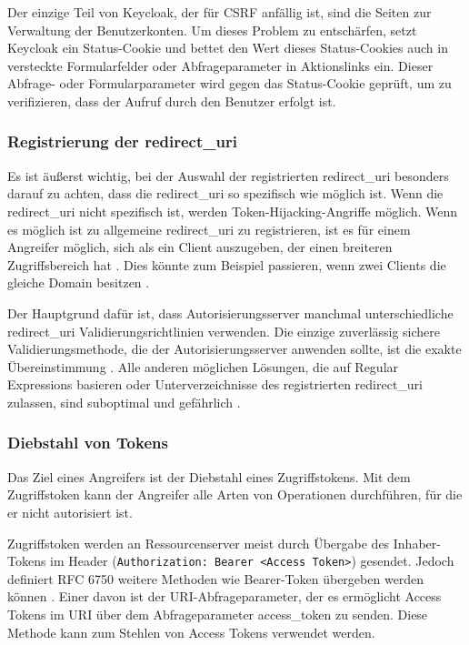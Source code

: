 Der einzige Teil von Keycloak, der für CSRF anfällig ist, sind die Seiten zur Verwaltung der Benutzerkonten. Um dieses Problem zu entschärfen, setzt Keycloak ein Status-Cookie und bettet den Wert dieses Status-Cookies auch in versteckte Formularfelder oder Abfrageparameter in Aktionslinks ein. Dieser Abfrage- oder Formularparameter wird gegen das Status-Cookie geprüft, um zu verifizieren, dass der Aufruf durch den Benutzer erfolgt ist. \cite{keycloakDocs}

\subsubsection{Registrierung der redirect\_uri}

Es ist äußerst wichtig, bei der Auswahl der registrierten redirect\_uri besonders darauf zu achten, dass die redirect\_uri so spezifisch wie möglich ist. Wenn die redirect\_uri nicht spezifisch ist, werden Token-Hijacking-Angriffe möglich. Wenn es möglich ist zu allgemeine redirect\_uri zu registrieren, ist es für einem Angreifer möglich, sich als ein Client auszugeben, der einen breiteren Zugriffsbereich hat \cite{keycloakDocs}. Dies könnte zum Beispiel passieren, wenn zwei Clients die gleiche Domain besitzen \cite{keycloakDocs}.

Der Hauptgrund dafür ist, dass Autorisierungsserver manchmal unterschiedliche redirect\_uri Validierungsrichtlinien verwenden. Die einzige zuverlässig sichere Validierungsmethode, die der Autorisierungsserver anwenden sollte, ist die exakte Übereinstimmung \cite{OAuth2inAction}. Alle anderen möglichen Lösungen, die auf Regular Expressions basieren oder Unterverzeichnisse des registrierten redirect\_uri zulassen, sind suboptimal und gefährlich \cite{OAuth2inAction}.



\subsubsection{Diebstahl von Tokens}

Das Ziel eines Angreifers ist der Diebstahl eines Zugriffstokens. Mit dem Zugriffstoken kann der Angreifer alle Arten von Operationen durchführen, für die er nicht autorisiert ist. 

Zugriffstoken werden an Ressourcenserver meist durch Übergabe des Inhaber-Tokens im Header (\texttt{Authorization: Bearer <Access Token>}) gesendet. Jedoch definiert RFC 6750 weitere Methoden wie Bearer-Token übergeben werden können \cite{RFC6750}. Einer davon ist der URI-Abfrageparameter, der es ermöglicht Access Tokens im URI über dem Abfrageparameter access\_token zu senden. Diese Methode kann zum Stehlen von Access Tokens verwendet werden. 

